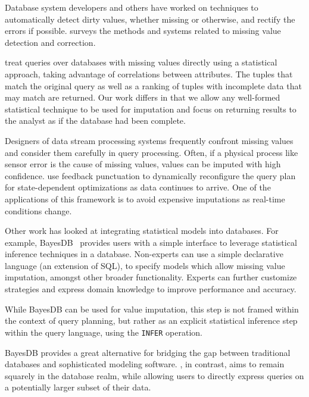 Database system developers and others have worked on techniques to automatically
detect dirty values, whether missing or otherwise, and rectify the errors if
possible. \textcite*{hellerstein2008quantitative} surveys the methods and systems related to missing value detection and correction.

\textcite*{wolf2007query} treat queries over databases with missing values directly using a statistical approach, taking advantage of correlations between
attributes. The tuples that match the original query as well as a ranking of
tuples with incomplete data that may match are returned. Our work differs in
that we allow any well-formed statistical technique to be used for imputation
and focus on returning results to the analyst as if the database had been
complete.

Designers of data stream processing systems frequently confront missing values
and consider them carefully in query processing. Often, if a physical process
like sensor error is the cause of missing values, values can be imputed with
high confidence. \textcite*{fernandez2009inter} use feedback punctuation to
dynamically
reconfigure the query plan for state-dependent
optimizations as data continues to arrive. One of the applications of this framework is to avoid
expensive imputations as real-time conditions change. 

Other work has looked at integrating statistical models into databases.
For example, BayesDB~\cite{mansinghka2015bayesdb} provides users with a simple interface to leverage statistical inference techniques in a database. Non-experts
can use a simple declarative language (an extension of SQL), to specify models
which allow missing value imputation, amongst other broader functionality.
Experts can further customize strategies and express domain knowledge to
improve performance and accuracy.

While BayesDB can be used for value imputation, this step is not framed
within the context of query planning, but rather as an explicit statistical
inference step within the query language, using the \verb|INFER| operation. 

BayesDB provides a great alternative for bridging the gap between
traditional databases and sophisticated modeling software. \ProjectName{}, in
contrast, aims to remain squarely in the database realm, while allowing
users to directly express queries on a potentially larger subset of their data.


